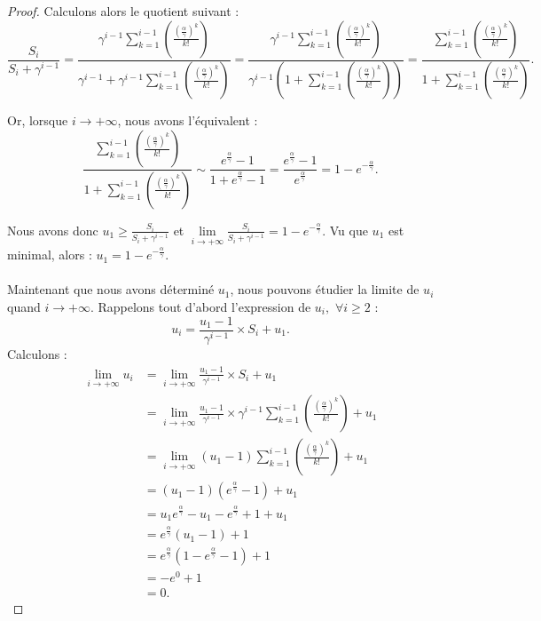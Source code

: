 \documentclass[12pt,a4paper]{report}
\theoremstyle{remark}
\begin{document}
\begin{proof}
Calculons alors le quotient suivant :
$$\frac{S_i}{S_i + \gamma^{i-1}} = \frac{\gamma^{i-1} \sum\limits_{k=1}^{i-1}\left(\frac{\left(\frac{\alpha}{\gamma}\right)^k}{k!}\right)}{\gamma^{i-1} + \gamma^{i-1} \sum\limits_{k=1}^{i-1}\left(\frac{\left(\frac{\alpha}{\gamma}\right)^k}{k!}\right)} = \frac{\gamma^{i-1} \sum\limits_{k=1}^{i-1}\left(\frac{\left(\frac{\alpha}{\gamma}\right)^k}{k!}\right)}{\gamma^{i-1} \left(1 + \sum\limits_{k=1}^{i-1}\left(\frac{\left(\frac{\alpha}{\gamma}\right)^k}{k!}\right)\right)} = \frac{\sum\limits_{k=1}^{i-1}\left(\frac{\left(\frac{\alpha}{\gamma}\right)^k}{k!}\right)}{1 + \sum\limits_{k=1}^{i-1}\left(\frac{\left(\frac{\alpha}{\gamma}\right)^k}{k!}\right)}.$$

Or, lorsque $i \rightarrow +\infty$, nous avons l'équivalent : 
$$\frac{\sum\limits_{k=1}^{i-1}\left(\frac{\left(\frac{\alpha}{\gamma}\right)^k}{k!}\right)}{1 + \sum\limits_{k=1}^{i-1}\left(\frac{\left(\frac{\alpha}{\gamma}\right)^k}{k!}\right)} \sim \frac{e^{\frac{\alpha}{\gamma}}-1}{1 + e^{\frac{\alpha}{\gamma}}-1} = \frac{e^{\frac{\alpha}{\gamma}}-1}{e^{\frac{\alpha}{\gamma}}} = 1 - e^{-\frac{\alpha}{\gamma}}.$$

Nous avons donc $u_1 \geqslant \frac{S_i}{S_i + \gamma^{i-1}}$ et $\lim\limits_{i \rightarrow +\infty} \frac{S_i}{S_i + \gamma^{i-1}} = 1 - e^{-\frac{\alpha}{\gamma}}$. Vu que $u_1$ est minimal, alors : $u_1 = 1 - e^{-\frac{\alpha}{\gamma}}.$
\\
\\
Maintenant que nous avons déterminé $u_1$, nous pouvons étudier la limite de $u_i$ quand $i \rightarrow + \infty$. Rappelons tout d'abord l'expression de $u_i, \, \, \forall i \geqslant 2$ :
$$u_i = \frac{u_1 - 1}{\gamma^{i-1}} \times S_i + u_1.$$
Calculons :
\begin{align*}
\lim\limits_{i \rightarrow +\infty} u_i &= \lim\limits_{i \rightarrow +\infty} \frac{u_1 - 1}{\gamma^{i-1}} \times S_i + u_1 \\
&= \lim\limits_{i \rightarrow +\infty} \frac{u_1 - 1}{\gamma^{i-1}} \times \gamma^{i-1} \sum_{k=1}^{i-1}\left(\frac{\left(\frac{\alpha}{\gamma}\right)^k}{k!}\right) + u_1 \\
&= \lim\limits_{i \rightarrow +\infty} (u_1 - 1) \sum_{k=1}^{i-1}\left(\frac{\left(\frac{\alpha}{\gamma}\right)^k}{k!}\right) + u_1 \\
&= (u_1 - 1)(e^{\frac{\alpha}{\gamma}}-1) + u_1 \\
&= u_1 e^{\frac{\alpha}{\gamma}} - u_1 - e^{\frac{\alpha}{\gamma}} + 1 + u_1 \\
&= e^{\frac{\alpha}{\gamma}} (u_1 - 1) + 1 \\
&= e^{\frac{\alpha}{\gamma}}(1 - e^{\frac{\alpha}{\gamma}} - 1) + 1 \\
&= -e^0 + 1 \\
&= 0.
\end{align*}
\end{proof}
\end{document}
